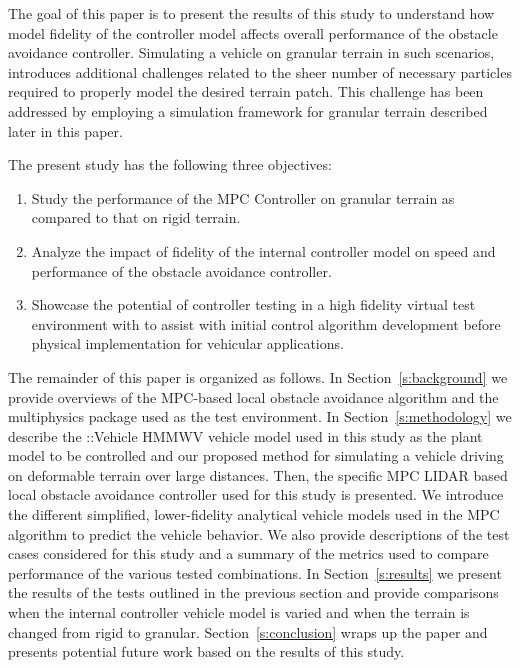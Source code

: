 \documentclass[12pt,twocolumn]{article}
\newcommand{\CHRONO}{{\sffamily{{Chrono}}}}
\newcommand{\ChronoVehicle}{{\sffamily{Chrono}}::Vehicle}
\begin{document}
The goal of this paper is to present the results of this study to understand how model fidelity of the controller model affects overall performance of the obstacle avoidance controller. Simulating a vehicle on granular terrain in such scenarios, introduces additional challenges related to the sheer number of necessary particles required to properly model the desired terrain patch. This challenge has been addressed by employing a simulation framework for granular terrain described later in this paper.

The present study has the following three objectives:
\begin{enumerate}
\item
Study the performance of the MPC Controller on granular terrain as compared to that on rigid terrain.
\item
Analyze the impact of fidelity of the internal controller model on speed and performance of the obstacle avoidance controller.
\item
Showcase the potential of controller testing in a high fidelity virtual test environment with {\CHRONO} to assist with initial control algorithm development before physical implementation for vehicular applications.
\end{enumerate}

The remainder of this paper is organized as follows.  In Section~\ref{s:background} we provide overviews of the MPC-based local obstacle avoidance algorithm and the {\CHRONO} multiphysics package used as the test environment. In Section~\ref{s:methodology} we describe the {\ChronoVehicle} HMMWV vehicle model used in this study as the plant model to be controlled and our proposed method for simulating a vehicle driving on deformable terrain over large distances. Then, the specific MPC LIDAR based local obstacle avoidance controller used for this study is presented. We introduce the different simplified, lower-fidelity analytical vehicle models used in the MPC algorithm to predict the {\CHRONO} vehicle behavior. We also provide descriptions of the test cases considered for this study and a summary of the metrics used to compare performance of the various tested combinations. In Section~\ref{s:results} we present the results of the tests outlined in the previous section and provide comparisons when the internal controller vehicle model is varied and when the terrain is changed from rigid to granular. Section~\ref{s:conclusion} wraps up the paper and presents potential future work based on the results of this study.
\end{document}
